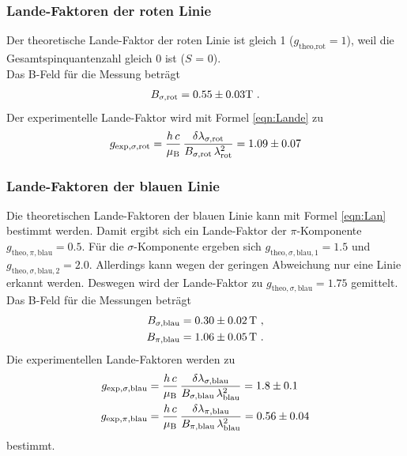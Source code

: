 \subsubsection{Lande-Faktoren der roten Linie}
Der theoretische Lande-Faktor der roten Linie ist gleich 1 ($g_\text{theo,rot} = 1$), weil die Gesamtspinquantenzahl gleich 0 ist ($S$ = 0). \\
Das B-Feld für die Messung beträgt
\begin{align*}
  B_{\sigma,\text{rot}} = \num{0.55 +- 0.03} \text{T} \ .
\end{align*}
Der experimentelle Lande-Faktor wird mit Formel \eqref{eqn:Lande} zu
\begin{align*}
  g_{\text{exp},\sigma,\text{rot}} = \frac{h\,c}{\mu_\text{B}}\,\frac{\delta \lambda_{\sigma,\text{rot}}}{B_{\sigma,\text{rot}}\,\lambda_\text{rot}^2} = \num{1.09 +- 0.07}
\end{align*}



\subsubsection{Lande-Faktoren der blauen Linie}
Die theoretischen Lande-Faktoren der blauen Linie kann mit Formel \eqref{eqn:Lan} bestimmt werden. Damit ergibt sich ein Lande-Faktor der $\pi$-Komponente $g_{\text{theo},\pi,\text{blau}} = 0.5$. Für die $\sigma$-Komponente ergeben sich $g_{\text{theo},\sigma,\text{blau},1} = 1.5$ und $g_{\text{theo},\sigma,\text{blau},2} = 2.0$. Allerdings kann wegen der geringen Abweichung nur eine Linie erkannt werden. Deswegen wird der Lande-Faktor zu $g_{\text{theo},\sigma,\text{blau}} = 1.75$ gemittelt.
Das B-Feld für die Messungen beträgt
\begin{align*}
  B_{\sigma,\text{blau}} = \num{0.3 +- 0.02}\, \text{T}\ , \\
  B_{\pi,\text{blau}} = \num{1.06 +- 0.05}\, \text{T}\ .
\end{align*}
Die experimentellen Lande-Faktoren werden zu
\begin{align*}
  g_{\text{exp},\sigma,\text{blau}} &= \frac{h\,c}{\mu_\text{B}}\,\frac{\delta \lambda_{\sigma,\text{blau}}}{B_{\sigma,\text{blau}}\,\lambda_\text{blau}^2} = \num{1.8 +- 0.1} \\
  g_{\text{exp},\pi,\text{blau}} &= \frac{h\,c}{\mu_\text{B}}\,\frac{\delta \lambda_{\pi,\text{blau}}}{B_{\pi,\text{blau}}\,\lambda_\text{blau}^2} = \num{0.56 +- 0.04}
\end{align*}
bestimmt.





















%
